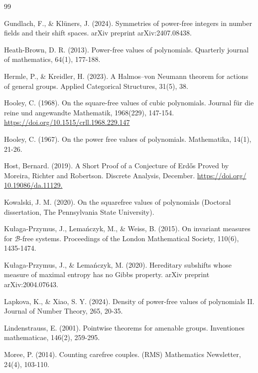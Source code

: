 \documentclass[a4paper,11pt,reqno]{amsart}
\theoremstyle{plain}
\theoremstyle{remark}
\newcommand{\cb}{\mathcal{B}}
\begin{document}
\begin{thebibliography}{99}
					
					Gundlach, F., \& Klüners, J. (2024). Symmetries of power-free integers in number fields and their shift spaces. arXiv preprint arXiv:2407.08438.
					
					
					
					
					
					Heath-Brown, D. R. (2013). Power-free values of polynomials. Quarterly journal of mathematics, 64(1), 177-188.
					
					
					Hermle, P., \& Kreidler, H. (2023). A Halmos–von Neumann theorem for actions of general groups. Applied Categorical Structures, 31(5), 38.
					
					Hooley, C. (1968). On the square-free values of cubic polynomials. Journal für die reine und angewandte Mathematik, 1968(229), 147-154. \url{https://doi.org/10.1515/crll.1968.229.147}
					
					Hooley, C. (1967). On the power free values of polynomials. Mathematika, 14(1), 21-26.
					
					Host, Bernard. (2019). A Short Proof of a  Conjecture of Erdős Proved by Moreira, Richter and Robertson. Discrete Analysis, December. \url{https:/​/​doi.org/​10.19086/​da.11129.}
					
					
					
					Kowalski, J. M. (2020). On the squarefree values of polynomials (Doctoral dissertation, The Pennsylvania State University).
					
					Kułaga-Przymus, J., Lemańczyk, M., \& Weiss, B. (2015). On invariant measures for $\cb$-free systems. Proceedings of the London Mathematical Society, 110(6), 1435-1474.
					
					Kułaga-Przymus, J., \& Lemańczyk, M. (2020). Hereditary subshifts whose measure of maximal entropy has no Gibbs property. arXiv preprint arXiv:2004.07643.
					
					
					Lapkova, K., \& Xiao, S. Y. (2024). Density of power-free values of polynomials II. Journal of Number Theory, 265, 20-35.
					
					Lindenstrauss, E. (2001). Pointwise theorems for amenable groups. Inventiones mathematicae, 146(2), 259-295.
					
					
					Moree, P. (2014). Counting carefree couples. (RMS) Mathematics Newsletter, 24(4), 103-110. 
					

\end{thebibliography}
\end{document}
